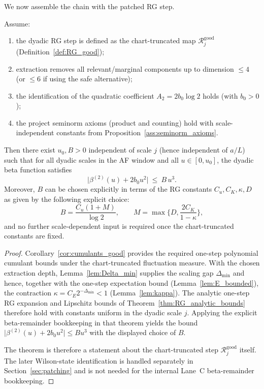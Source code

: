 We now assemble the chain with the patched RG step.

\begin{theorem}\label{thm:beta_remainder_closed}
Assume:
\begin{enumerate}[label=(H\arabic*)]
\item the dyadic RG step is defined as the chart-truncated map $\mathcal R_j^{\mathrm{good}}$ (Definition~\ref{def:RG_good});
\item extraction removes all relevant/marginal components up to dimension $\le 4$ (or $\le 6$ if using the safe alternative);
\item the identification of the quadratic coefficient $A_2=2b_0\log2$ holds (with $b_0>0$);
\item the project seminorm axioms (product and counting) hold with scale-independent constants from Proposition~\ref{ass:seminorm_axioms}.
\end{enumerate}
Then there exist $u_0,B>0$ independent of scale $j$ (hence independent of $a/L$) such that for all dyadic scales in the AF window and all $u\in[0,u_0]$,
the dyadic beta function satisfies
\[
\big|\beta^{(2)}(u)+2b_0 u^2\big|\ \le\ B\,u^3.
\]
Moreover, $B$ can be chosen explicitly in terms of the RG constants $C_u,C_K,\kappa,D$ as given by the following explicit choice:
\[
B=\frac{C_u(1+M)}{\log2},\qquad M=\max\Big\{D,\frac{2C_K}{1-\kappa}\Big\},
\]
and no further scale-dependent input is required once the chart-truncated constants are fixed.
\end{theorem}

\begin{proof}
Corollary~\ref{cor:cumulants_good} provides the required one-step polynomial cumulant bounds under the chart-truncated fluctuation measure.
With the chosen extraction depth, Lemma~\ref{lem:Delta_min} supplies the scaling gap $\Delta_{\min}$ and hence, together with the one-step expectation bound (Lemma~\ref{lem:E_bounded}), the contraction $\kappa=C_E2^{-\Delta_{\min}}<1$ (Lemma~\ref{lem:kappa}).
The analytic one-step RG expansion and Lipschitz bounds of Theorem~\ref{thm:RG_analytic_bounds} therefore hold with constants uniform in the dyadic scale $j$.
Applying the explicit beta-remainder bookkeeping in that theorem yields the bound
$\big|\beta^{(2)}(u)+2b_0u^2\big|\le Bu^3$ with the displayed choice of $B$.

The theorem is therefore a statement about the chart-truncated step $\mathcal R_j^{\mathrm{good}}$ itself.
The later Wilson-state identification is handled separately in Section~\ref{sec:patching} and is not needed for the internal Lane~C beta-remainder bookkeeping.
\end{proof}

